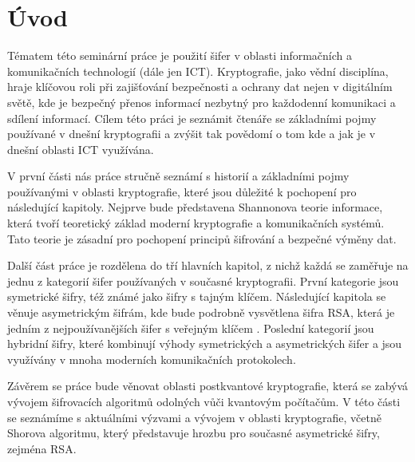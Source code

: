 \section {Úvod}
Tématem této seminární práce je použití šifer v oblasti informačních a komunikačních technologií (dále jen ICT). Kryptografie, jako vědní disciplína, hraje klíčovou roli při zajišťování bezpečnosti a ochrany dat nejen v digitálním světě, kde je bezpečný přenos informací nezbytný pro každodenní komunikaci a sdílení informací. Cílem této práci je seznámit čtenáře se základními pojmy používané v dnešní kryptografii a zvýšit tak povědomí o tom kde a jak je v dnešní oblasti ICT využívána.

V první části nás práce stručně seznámí s historií a základními pojmy používanými v oblasti kryptografie, které jsou důležité k pochopení pro následující kapitoly. Nejprve bude představena Shannonova teorie informace, která tvoří teoretický základ moderní kryptografie a komunikačních systémů. Tato teorie je zásadní pro pochopení principů šifrování a bezpečné výměny dat.

Další část práce je rozdělena do tří hlavních kapitol, z nichž každá se zaměřuje na jednu z kategorií šifer používaných v současné kryptografii. První kategorie jsou symetrické šifry, též známé jako šifry s tajným klíčem. Následující kapitola se věnuje asymetrickým šifrám, kde bude podrobně vysvětlena šifra RSA, která je jedním z nejpoužívanějších šifer s veřejným klíčem \parencite{drake2024}. Poslední kategorií jsou hybridní šifry, které kombinují výhody symetrických a asymetrických šifer a jsou využívány v mnoha moderních komunikačních protokolech.

Závěrem se práce bude věnovat oblasti postkvantové kryptografie, která se zabývá vývojem šifrovacích algoritmů odolných vůči kvantovým počítačům. V této části se seznámíme s aktuálními výzvami a vývojem v oblasti kryptografie, včetně Shorova algoritmu, který představuje hrozbu pro současné asymetrické šifry, zejména RSA.
\newpage